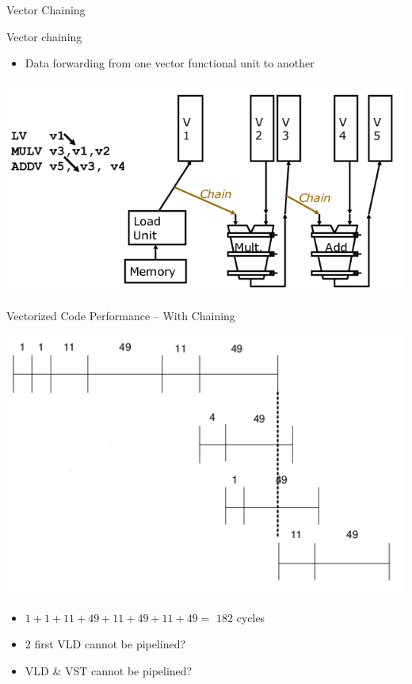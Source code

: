\documentclass[presentation]{beamer}
\begin{document}
\begin{frame}[label={sec:org99947d6}]{Vector Chaining}
\begin{block}{Vector chaining}
\begin{itemize}
\item Data forwarding from one vector functional unit to another
\end{itemize}
\end{block}

\begin{block}{}
\begin{center}
\includegraphics[width=.9\linewidth]{./images/slides_SIMD_38_small.png}
\end{center}
\end{block}
\end{frame}


\begin{frame}[label={sec:orge7f3ddf}]{Vectorized Code Performance -- With Chaining}
\begin{block}{}
\begin{center}
\includegraphics[width=.8\textwidth]{./images/slides_SIMD_39_small.png}
\end{center}
\end{block}

\begin{block}{}
\begin{itemize}
\item \(1+1+11+49+11+49+11+49=\) \alert{\(182\)} cycles
\end{itemize}
\pause
\begin{itemize}
\item \small 2 first VLD cannot be pipelined?
\item \small VLD \& VST cannot be pipelined?
\end{itemize}
\end{block}
\end{frame}
\end{document}
